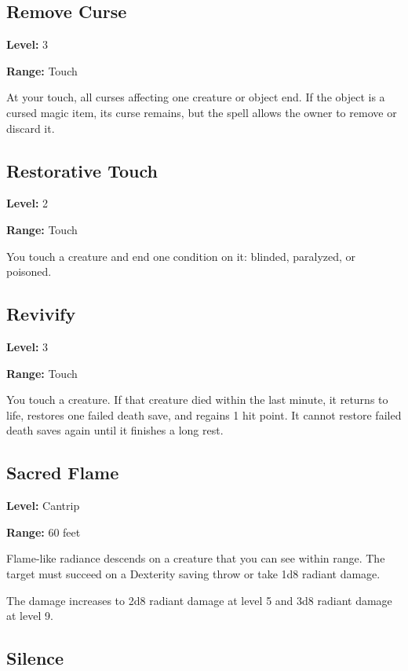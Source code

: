 \documentclass[12pt,letterpaper,twocolumn,openany,nodeprecatedcode,bg=none]{dndbook}
\let\oldsubsection\subsection
\renewcommand{\subsection}[1]{%
  \needspace{5\baselineskip}%
  \oldsubsection{#1}%
}
\begin{document}
\subsection{Remove Curse}\label{remove-curse}

\textbf{Level:} 3

\textbf{Range:} Touch

At your touch, all curses affecting one creature or object end. If the
object is a cursed magic item, its curse remains, but the spell allows
the owner to remove or discard it.

\subsection{Restorative Touch}\label{restorative-touch}

\textbf{Level:} 2

\textbf{Range:} Touch

You touch a creature and end one condition on it: blinded, paralyzed, or
poisoned.

\newpage

\subsection{Revivify}\label{revivify}

\textbf{Level:} 3

\textbf{Range:} Touch

You touch a creature. If that creature died within the last minute, it
returns to life, restores one failed death save, and regains 1 hit
point. It cannot restore failed death saves again until it finishes a
long rest.

\subsection{Sacred Flame}\label{sacred-flame}

\textbf{Level:} Cantrip

\textbf{Range:} 60 feet

Flame-like radiance descends on a creature that you can see within
range. The target must succeed on a Dexterity saving throw or take 1d8
radiant damage.

The damage increases to 2d8 radiant damage at level 5 and 3d8 radiant
damage at level 9.

\subsection{Silence}\label{silence}
\end{document}
